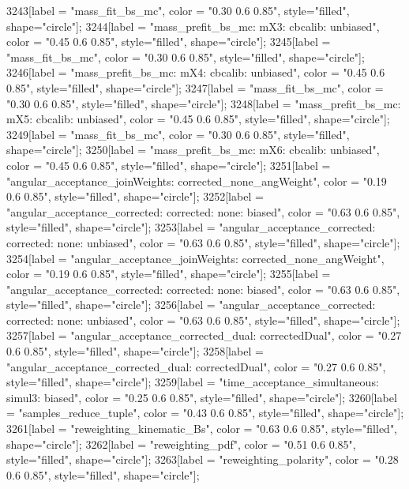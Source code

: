 {	3243[label = "mass_fit_bs_mc", color = "0.30 0.6 0.85", style="filled", shape="circle"];
	3244[label = "mass_prefit_bs_mc\nmassbin: mX3\nmassmodel: cbcalib\ntrigger: unbiased", color = "0.45 0.6 0.85", style="filled", shape="circle"];
	3245[label = "mass_fit_bs_mc", color = "0.30 0.6 0.85", style="filled", shape="circle"];
	3246[label = "mass_prefit_bs_mc\nmassbin: mX4\nmassmodel: cbcalib\ntrigger: unbiased", color = "0.45 0.6 0.85", style="filled", shape="circle"];
	3247[label = "mass_fit_bs_mc", color = "0.30 0.6 0.85", style="filled", shape="circle"];
	3248[label = "mass_prefit_bs_mc\nmassbin: mX5\nmassmodel: cbcalib\ntrigger: unbiased", color = "0.45 0.6 0.85", style="filled", shape="circle"];
	3249[label = "mass_fit_bs_mc", color = "0.30 0.6 0.85", style="filled", shape="circle"];
	3250[label = "mass_prefit_bs_mc\nmassbin: mX6\nmassmodel: cbcalib\ntrigger: unbiased", color = "0.45 0.6 0.85", style="filled", shape="circle"];
	3251[label = "angular_acceptance_joinWeights\nwflag: corrected_none_angWeight", color = "0.19 0.6 0.85", style="filled", shape="circle"];
	3252[label = "angular_acceptance_corrected\nangacc: corrected\ncsp: none\ntrigger: biased", color = "0.63 0.6 0.85", style="filled", shape="circle"];
	3253[label = "angular_acceptance_corrected\nangacc: corrected\ncsp: none\ntrigger: unbiased", color = "0.63 0.6 0.85", style="filled", shape="circle"];
	3254[label = "angular_acceptance_joinWeights\nwflag: corrected_none_angWeight", color = "0.19 0.6 0.85", style="filled", shape="circle"];
	3255[label = "angular_acceptance_corrected\nangacc: corrected\ncsp: none\ntrigger: biased", color = "0.63 0.6 0.85", style="filled", shape="circle"];
	3256[label = "angular_acceptance_corrected\nangacc: corrected\ncsp: none\ntrigger: unbiased", color = "0.63 0.6 0.85", style="filled", shape="circle"];
	3257[label = "angular_acceptance_corrected_dual\nstep: correctedDual", color = "0.27 0.6 0.85", style="filled", shape="circle"];
	3258[label = "angular_acceptance_corrected_dual\nstep: correctedDual", color = "0.27 0.6 0.85", style="filled", shape="circle"];
	3259[label = "time_acceptance_simultaneous\ntimeacc: simul3\ntrigger: biased", color = "0.25 0.6 0.85", style="filled", shape="circle"];
	3260[label = "samples_reduce_tuple", color = "0.43 0.6 0.85", style="filled", shape="circle"];
	3261[label = "reweighting_kinematic_Bs", color = "0.63 0.6 0.85", style="filled", shape="circle"];
	3262[label = "reweighting_pdf", color = "0.51 0.6 0.85", style="filled", shape="circle"];
	3263[label = "reweighting_polarity", color = "0.28 0.6 0.85", style="filled", shape="circle"];
}
